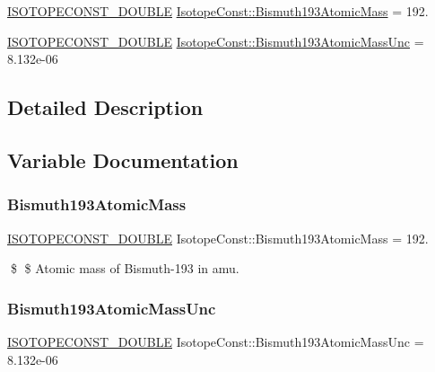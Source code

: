 \begin{DoxyCompactItemize}
\item 
\mbox{\hyperlink{group___isotope_const-_macros_ga8f45a7272ce02c0b4c65c44636ed719a}{I\+S\+O\+T\+O\+P\+E\+C\+O\+N\+S\+T\+\_\+\+D\+O\+U\+B\+LE}} \mbox{\hyperlink{group___isotope_const-_bismuth-_bi193_gab37f160bc8ce437558d3be4073e885cd}{Isotope\+Const\+::\+Bismuth193\+Atomic\+Mass}} = 192.
\item 
\mbox{\hyperlink{group___isotope_const-_macros_ga8f45a7272ce02c0b4c65c44636ed719a}{I\+S\+O\+T\+O\+P\+E\+C\+O\+N\+S\+T\+\_\+\+D\+O\+U\+B\+LE}} \mbox{\hyperlink{group___isotope_const-_bismuth-_bi193_gaf2f8f6e6dddd866110e0a627743bffa1}{Isotope\+Const\+::\+Bismuth193\+Atomic\+Mass\+Unc}} = 8.\+132e-\/06
\end{DoxyCompactItemize}


\subsection{Detailed Description}


\subsection{Variable Documentation}
\mbox{\label{group___isotope_const-_bismuth-_bi193_gab37f160bc8ce437558d3be4073e885cd}} 
\subsubsection{\texorpdfstring{Bismuth193\+Atomic\+Mass}{Bismuth193AtomicMass}}
{\footnotesize\ttfamily \mbox{\hyperlink{group___isotope_const-_macros_ga8f45a7272ce02c0b4c65c44636ed719a}{I\+S\+O\+T\+O\+P\+E\+C\+O\+N\+S\+T\+\_\+\+D\+O\+U\+B\+LE}} Isotope\+Const\+::\+Bismuth193\+Atomic\+Mass = 192.}

\$ \$ Atomic mass of Bismuth-\/193 in amu. \mbox{\label{group___isotope_const-_bismuth-_bi193_gaf2f8f6e6dddd866110e0a627743bffa1}} 
\subsubsection{\texorpdfstring{Bismuth193\+Atomic\+Mass\+Unc}{Bismuth193AtomicMassUnc}}
{\footnotesize\ttfamily \mbox{\hyperlink{group___isotope_const-_macros_ga8f45a7272ce02c0b4c65c44636ed719a}{I\+S\+O\+T\+O\+P\+E\+C\+O\+N\+S\+T\+\_\+\+D\+O\+U\+B\+LE}} Isotope\+Const\+::\+Bismuth193\+Atomic\+Mass\+Unc = 8.\+132e-\/06}


